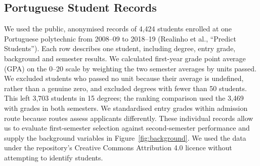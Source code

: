 \subsection{Portuguese Student Records}
\label{sec:data-portugal}

We used the public, anonymised records of 4,424 students enrolled at one Portuguese polytechnic from 2008--09 to 2018--19 (Realinho et al., ``Predict Students''). Each row describes one student, including degree, entry grade, background and semester results. We calculated first-year grade point average (GPA) on the 0--20 scale by weighting the two semester averages by units passed. We excluded students who passed no unit because their average is undefined, rather than a genuine zero, and excluded degrees with fewer than 50 students. This left 3,703 students in 15 degrees; the ranking comparison used the 3,469 with grades in both semesters. We standardised entry grades within admission route because routes assess applicants differently. These individual records allow us to evaluate first-semester selection against second-semester performance and supply the background variables in Figure~\ref{fig:background}. We used the data under the repository's Creative Commons Attribution 4.0 licence without attempting to identify students.


